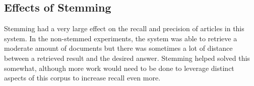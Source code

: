 \documentclass{article}%
\begin{document}
\subsection*{Effects of Stemming}

Stemming had a very large effect on the recall and precision of articles in this system. In the non-stemmed experiments, the system was able
to retrieve a moderate amount of documents but there was sometimes a lot of distance between a retrieved result and the desired answer.
Stemming helped solved this somewhat, although more work would need to be done to leverage distinct aspects of this corpus to increase recall
even more.
\end{document}
